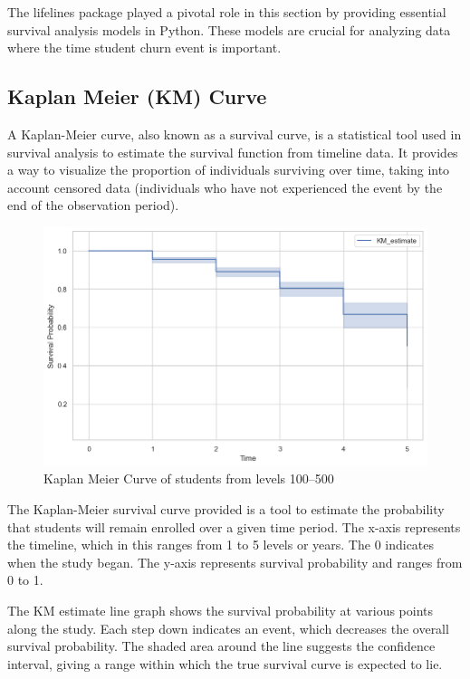 \documentclass[doublespacing]{report} %
\begin{document}
The lifelines package played a pivotal role in this section by providing essential survival analysis models in Python. These models are crucial for analyzing data where the time student churn event is important. 


\subsection{Kaplan Meier (KM) Curve}

A Kaplan-Meier curve, also known as a survival curve, is a statistical tool used in survival analysis to estimate the survival function from timeline data. It provides a way to visualize the proportion of individuals surviving over time, taking into account censored data (individuals who have not experienced the event by the end of the observation period).
\begin{figure}[H]
    \centering
    \includegraphics[width=1\linewidth]{Figure 4/4.1.png}
    \caption{Kaplan Meier Curve of students from levels 100–500}
\end{figure}

The Kaplan-Meier survival curve provided is a tool to estimate the probability that students will remain enrolled over a given time period. The x-axis represents the timeline, which in this ranges from 1 to 5 levels or years. The 0 indicates when the study began. The y-axis represents survival probability and ranges from 0 to 1.


The KM estimate line graph shows the survival probability at various points along the study. Each step down indicates an event, which decreases the overall survival probability. The shaded area around the line suggests the confidence interval, giving a range within which the true survival curve is expected to lie.
\end{document}
